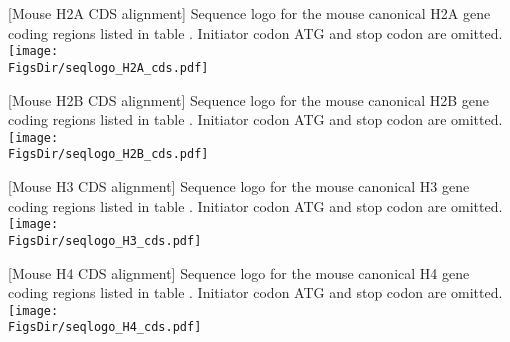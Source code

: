 
\newpage
\begin{center}
  [Mouse H2A CDS alignment]{
    Sequence logo for the mouse canonical H2A gene coding regions
    listed in table .
    Initiator codon ATG and stop codon are omitted.
  }
  \texttt{[image: \\FigsDir/seqlogo\_H2A\_cds.pdf]}
\end{center}
\newpage
\begin{center}
  [Mouse H2B CDS alignment]{
    Sequence logo for the mouse canonical H2B gene coding regions
    listed in table .
    Initiator codon ATG and stop codon are omitted.
  }
  \texttt{[image: \\FigsDir/seqlogo\_H2B\_cds.pdf]}
\end{center}
\newpage
\begin{center}
  [Mouse H3 CDS alignment]{
    Sequence logo for the mouse canonical H3 gene coding regions
    listed in table .
    Initiator codon ATG and stop codon are omitted.
  }
  \texttt{[image: \\FigsDir/seqlogo\_H3\_cds.pdf]}
\end{center}
\newpage
\begin{center}
  [Mouse H4 CDS alignment]{
    Sequence logo for the mouse canonical H4 gene coding regions
    listed in table .
    Initiator codon ATG and stop codon are omitted.
  }
  \texttt{[image: \\FigsDir/seqlogo\_H4\_cds.pdf]}
\end{center}

